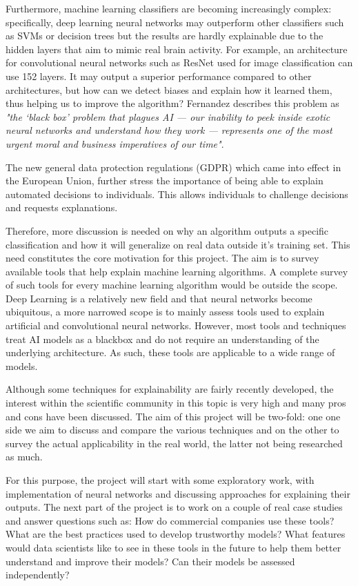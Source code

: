 \documentclass[proposal]{softeng}
\begin{document}
Furthermore, machine learning classifiers are becoming increasingly complex: specifically, deep learning neural networks may outperform other classifiers such as SVMs or decision trees but the results are hardly explainable due to the hidden layers that aim to mimic real brain activity. For example, an architecture for convolutional neural networks such as ResNet\cite{res-net} used for image classification can use 152 layers. It may output a superior performance compared to other architectures, but how can we detect biases and explain how it learned them, thus helping us to improve the algorithm?  Fernandez\cite{27} describes this problem as \textit{"the ‘black box’ problem that plagues AI — our inability to peek inside exotic neural networks and understand how they work — represents one of the most urgent moral and business imperatives of our time"}.

The new general data protection regulations (GDPR) which came into effect in the European Union, further stress the importance of being able to explain automated decisions to individuals. This allows individuals to challenge decisions \cite{GoodmanB2017EUro, gdpr} and requests explanations.

Therefore, more discussion is needed on why an algorithm outputs a specific classification and how it will generalize on real data outside it's training set. This need constitutes the core motivation for this project. The aim is to survey available tools that help explain machine learning algorithms. A complete survey of such tools for every machine learning algorithm would be outside the scope. Deep Learning is a relatively new field and that neural networks become ubiquitous, a more narrowed scope is to mainly assess tools used to explain artificial and convolutional neural networks. However, most tools and techniques treat AI models as a blackbox and do not require an understanding of the underlying architecture. As such, these tools are applicable to a wide range of models.

Although some techniques for explainability are fairly recently developed, the interest within the scientific community in this topic is very high and many pros and cons have been discussed. The aim of this project will be two-fold: one one side we aim to discuss and compare the various techniques and on the other to survey the actual applicability in the real world, the latter not being researched as much. 

For this purpose, the project will start with some exploratory work, with implementation of neural networks and discussing approaches for explaining their outputs. The next part of the project is to work on a couple of real case studies and answer questions such as: How do commercial companies use these tools? What are the best practices used to develop trustworthy models? What features would data scientists like to see in these tools in the future to help them better understand and improve their models? Can their models be assessed independently?
\end{document}
